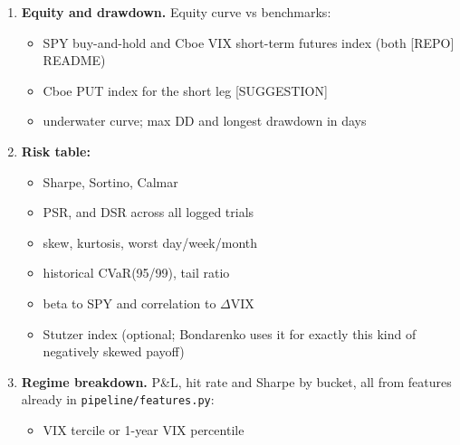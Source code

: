 \documentclass{article}
\begin{document}
\begin{enumerate}
\begin{itemize}
\item Forecast accuracy (QLIKE /\allowbreak{} MSE) per fold, already proposed in the RV-forecasting report per PROGRESS.

\end{itemize}

\item \textbf{Equity and drawdown.} Equity curve vs benchmarks:

\begin{itemize}

\item SPY buy-and-hold and Cboe VIX short-term futures index (both [REPO] README)

\item Cboe PUT index for the short leg [SUGGESTION]

\item underwater curve; max DD and longest drawdown in days

\end{itemize}

\item \textbf{Risk table:}

\begin{itemize}

\item Sharpe, Sortino, Calmar

\item PSR, and DSR across all logged trials

\item skew, kurtosis, worst day/\allowbreak{}week/\allowbreak{}month

\item historical CVaR(95/\allowbreak{}99), tail ratio

\item beta to SPY and correlation to \ensuremath{\Delta}VIX

\item Stutzer index (optional; Bondarenko uses it for exactly this kind of negatively skewed payoff)

\end{itemize}

\item \textbf{Regime breakdown.} P\&L, hit rate and Sharpe by bucket, all from features already in \texttt{pipeline/\allowbreak{}features.\allowbreak{}py}:

\begin{itemize}

\item VIX tercile or 1-year VIX percentile


\end{itemize}
\end{enumerate}
\end{document}
